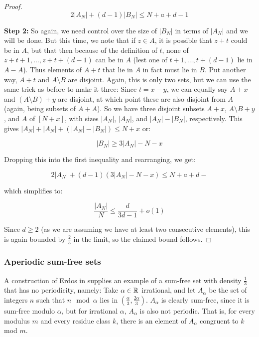 \documentclass{article}
\theoremstyle{definition}
\theoremstyle{remark}
\numberwithin{equation}{section}
\begin{document}
\begin{proof}
\[2|A_N|+(d-1)|B_N| \leq N+a+d-1\]

\textbf{Step 2: }So again, we need control over the size of $|B_N|$ in
terms of $|A_N|$ and we will be done.  But this time, we note that if
$z \in A$, it is possible that $z+t$ could be in $A$, but that then
because of the definition of $t$, none of $z+t+1, \ldots, z+t+(d-1)$
can be in $A$ (lest one of $t+1, \ldots, t+(d-1)$ lie in $A-A$).  Thus
elements of $A+t$ that lie in $A$ in fact must lie in $B$.  Put another
way, $A+t$ and $A \setminus B$ are disjoint.  Again, this is only two
sets, but we can use the same trick as before to make it three: Since
$t = x-y$, we can equally say $A+x$ and $(A \setminus B) + y$ are
disjoint, at which point these are also disjoint from $A$ (again,
being subsets of $A+A$).  So we have three disjoint subsets $A+x$,
$A \setminus B + y$, and $A$ of $[N+x]$, with sizes $|A_N|$, $|A_N|$,
and $|A_N|-|B_N|$, respectively.  This gives
$|A_N| + |A_N| + (|A_N| - |B_N|) \leq N+x$ or:

\[|B_N| \geq 3|A_N|-N-x\]

Dropping this into the first inequality and rearranging, we get:

\[2|A_N|+(d-1)(3|A_N|-N-x) \leq N+a+d-\]

which simplifies to: 

\[\frac{|A_N|}{N} \leq \frac{d}{3d-1} + o(1)\]

Since $d \geq 2$ (as we are assuming we have at least two consecutive
elements), this is again bounded by $\frac25$ in the limit, so the
claimed bound follows.
\end{proof}

\subsubsection{Aperiodic sum-free sets}

A construction of Erdos in \cite{aperiodic_sumfree_erdos} supplies an
example of a sum-free set with density $\frac13$ that has no
periodicity, namely: Take $\alpha \in \mathbb{R}$ irrational, and let
$A_\alpha$ be the set of integers $n$ such that $n \mod{\alpha}$ lies
in $\left(\frac \alpha 3, \frac {2\alpha}{3}\right)$.  $A_\alpha$ is
clearly sum-free, since it is sum-free modulo $\alpha$, but for
irrational $\alpha$, $A_\alpha$ is also not periodic.  That is, for
every modulus $m$ and every residue class $k$, there is an element of
$A_\alpha$ congruent to $k$ mod $m$.  
\end{document}
